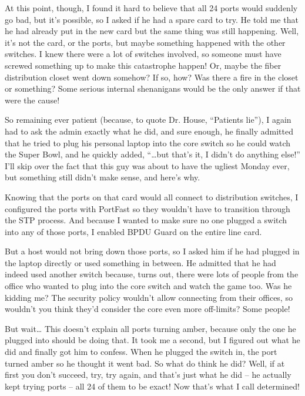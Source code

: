 At this point, though, I found it hard to believe that all 24 ports
would suddenly go bad, but it's possible, so I asked if he had a spare
card to try. He told me that he had already put in the new card but the
same thing was still happening. Well, it's not the card, or the ports,
but maybe something happened with the other switches. I knew there were
a lot of switches involved, so someone must have screwed something up to
make this catastrophe happen! Or, maybe the fiber distribution closet
went down somehow? If so, how? Was there a fire in the closet or
something? Some serious internal shenanigans would be the only answer if
that were the cause!

So remaining ever patient (because, to quote Dr. House, ``Patients
lie''), I again had to ask the admin exactly what he did, and sure
enough, he finally admitted that he tried to plug his personal laptop
into the core switch so he could watch the Super Bowl, and he quickly
added, ``\ldots but that's it, I didn't do anything else!'' I'll skip
over the fact that this guy was about to have the ugliest Monday ever,
but something still didn't make sense, and here's why.

Knowing that the ports on that card would all connect to distribution
switches, I configured the ports with PortFast so they wouldn't have to
transition through the STP process. And because I wanted to make sure no
one plugged a switch into any of those ports, I enabled BPDU Guard on
the entire line card.

But a host would not bring down those ports, so I asked him if he had
plugged in the laptop directly or used something in between. He admitted
that he had indeed used another switch because, turns out, there were
lots of people from the office who wanted to plug into the core switch
and watch the game too. Was he kidding me? The security policy wouldn't
allow connecting from their offices, so wouldn't you think they'd
consider the core even more off-limits? Some people!

But wait\ldots{} This
doesn't explain all ports turning amber, because only the one he plugged
into should be doing that. It took me a second, but I figured out what
he did and finally got him to confess. When he plugged the switch in,
the port turned amber so he thought it went bad. So what do think he
did? Well, if at first you don't succeed, try, try again, and that's
just what he did -- he actually kept trying ports -- all 24 of them to be
exact! Now that's what I call determined!

